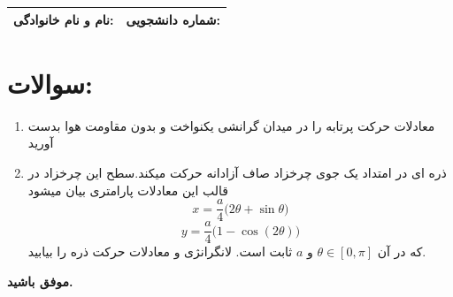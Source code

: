 \documentclass[12pt,a4paper]{article}
\begin{document}
	
	\begin{tabular}{|p{7cm}|p{7cm}|}
		\hline
		\textbf{نام و نام خانوادگی:} & \textbf{شماره دانشجویی:} \\
		\hline
	\end{tabular}
	
	\section*{سوالات:}
	
	\begin{enumerate}
		\item 
		معادلات حرکت پرتابه را در میدان گرانشی یکنواخت و بدون مقاومت هوا بدست آورید
		\item 
			ذره ای در امتداد یک جوی چرخزاد صاف آزادانه حرکت میکند.سطح این چرخزاد در قالب این معادلات پارامتری بیان میشود
			\\
	\[
	x=\frac{a}{4}\bigl(2\theta+\sin\theta\bigr)
	\]
	\[
	y=\frac{a}{4}\bigl(1-\cos(2\theta)\bigr)
	\]که در آن $\theta \in [0,\pi]$ و $a$ ثابت است.
	لانگرانژی و معادلات حرکت ذره را بیابید.
	
	\end{enumerate}
	
	\vspace{10pt}
	\textbf{موفق باشید.}
	
\end{document}
